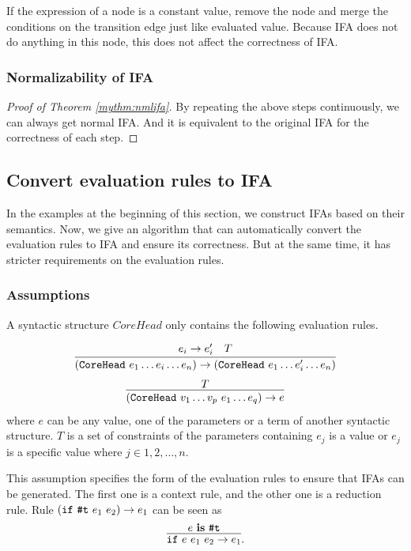 If the expression of a node is a constant value, remove the node and merge the conditions on the transition edge just like evaluated value. Because IFA does not do anything in this node, this does not affect the correctness of IFA.

\subsubsection{Normalizability of IFA}

\begin{proof}[Proof of Theorem \ref{mythm:nmlifa}]
By repeating the above steps continuously, we can always get normal IFA. And it is equivalent to the original IFA for the correctness of each step.
\end{proof}

\subsection{Convert evaluation rules to IFA}

In the examples at the beginning of this section, we construct IFAs based on their semantics. Now, we give an algorithm that can automatically convert the evaluation rules to IFA and ensure its correctness. But at the same time, it has stricter requirements on the evaluation rules.

\subsubsection{Assumptions}

\begin{Asm}
\label{Asm:rules}
A syntactic structure $CoreHead$ only contains the following evaluation rules.

\[
\infer
{(\m{CoreHead}~e_1 \ldots e_i \ldots e_n) \to (\m{CoreHead}~e_1 \ldots e_i' \ldots e_n)}{e_i \to e_i'\quad T}
\]
\[
\infer{(\m{CoreHead}~v_1 \ldots v_p~e_1 \ldots e_q) \to e}{T}
\]
where $e$ can be any value, one of the parameters or a term of another syntactic structure. $T$ is a set of constraints of the parameters containing $e_j$ is a value or $e_j$ is a specific value where $j \in 1,2,\ldots,n$.
\end{Asm}

This assumption specifies the form of the evaluation rules to ensure that IFAs can be generated. The first one is a context rule, and the other one is a reduction rule. Rule $(\mbox{\tt if}~\mbox{\tt \#t}~e_1~e_2) \to e_1$ can be seen as \[\infer{\m{if}~e~e_1~e_2 \to e_1}{e~\key{is}~\m{\#t}}.\]

